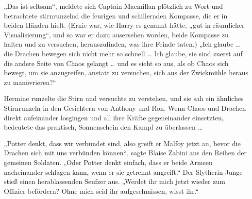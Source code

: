 „Das ist seltsam“, meldete sich Captain Macmillan plötzlich zu Wort und betrachtete stirnrunzelnd die feurigen und schillernden Kompasse, die er in beiden Händen hielt. (Ernie war, wie Harry es genannt hätte, „gut in räumlicher Visualisierung“, und so war er dazu ausersehen worden, beide Kompasse zu halten und zu versuchen, herauszufinden, was ihre Feinde taten.)
„Ich glaube … die Drachen bewegen sich nicht mehr so schnell … Ich glaube, sie sind zuerst auf die andere Seite von Chaos gelangt … und es sieht so aus, als ob Chaos sich bewegt, um sie anzugreifen, anstatt zu versuchen, sich aus der Zwickmühle heraus zu manövrieren?“

Hermine runzelte die Stirn und versuchte zu verstehen, und sie sah ein ähnliches Stirnrunzeln in den Gesichtern von Anthony und Ron. Wenn Chaos und Drachen direkt aufeinander losgingen und all ihre Kräfte gegeneinander einsetzten, bedeutete das praktisch, Sonnenschein den Kampf zu überlassen …

„Potter denkt, dass wir verbündet sind, also greift er Malfoy jetzt an, bevor die Drachen sich mit uns verbünden können“, sagte Blaise Zabini aus den Reihen der gemeinen Soldaten.
„Oder Potter denkt einfach, dass er beide Armeen nacheinander schlagen kann, wenn er sie getrennt angreift.“ Der Slytherin-Junge stieß einen herablassenden Seufzer aus.
„Werdet ihr mich jetzt wieder zum Offizier befördern? Ohne mich seid ihr aufgeschmissen, wisst ihr.“


